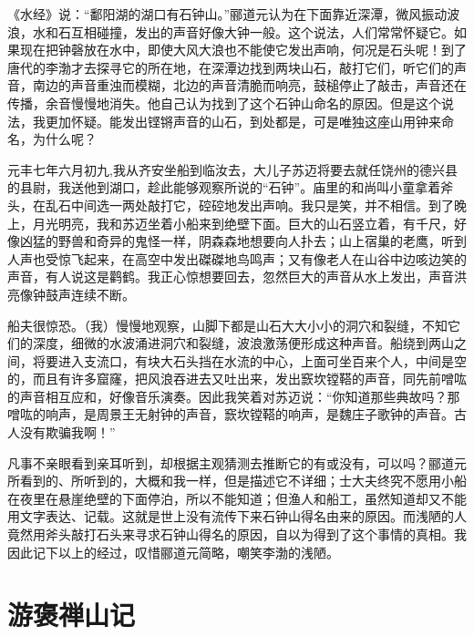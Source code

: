 \documentclass[12pt,UTF-8,openany,a4]{ctexbook}
\begin{document}
\vspace{1em}

\begin{large}\yiwen
    
    《水经》说：“鄱阳湖的湖口有石钟山。”郦道元认为在下面靠近深潭，微风振动波浪，水和石互相碰撞，发出的声音好像大钟一般。这个说法，人们常常怀疑它。如果现在把钟磬放在水中，即使大风大浪也不能使它发出声响，何况是石头呢！到了唐代的李渤才去探寻它的所在地，在深潭边找到两块山石，敲打它们，听它们的声音，南边的声音重浊而模糊，北边的声音清脆而响亮，鼓槌停止了敲击，声音还在传播，余音慢慢地消失。他自己认为找到了这个石钟山命名的原因。但是这个说法，我更加怀疑。能发出铿锵声音的山石，到处都是，可是唯独这座山用钟来命名，为什么呢？
    
    元丰七年六月初九,我从齐安坐船到临汝去，大儿子苏迈将要去就任饶州的德兴县的县尉，我送他到湖口，趁此能够观察所说的“石钟”。庙里的和尚叫小童拿着斧头，在乱石中间选一两处敲打它，硿硿地发出声响。我只是笑，并不相信。到了晚上，月光明亮，我和苏迈坐着小船来到绝壁下面。巨大的山石竖立着，有千尺，好像凶猛的野兽和奇异的鬼怪一样，阴森森地想要向人扑去；山上宿巢的老鹰，听到人声也受惊飞起来，在高空中发出磔磔地鸟鸣声；又有像老人在山谷中边咳边笑的声音，有人说这是鹳鹤。我正心惊想要回去，忽然巨大的声音从水上发出，声音洪亮像钟鼓声连续不断。
    
    船夫很惊恐。（我）慢慢地观察，山脚下都是山石大大小小的洞穴和裂缝，不知它们的深度，细微的水波涌进洞穴和裂缝，波浪激荡便形成这种声音。船绕到两山之间，将要进入支流口，有块大石头挡在水流的中心，上面可坐百来个人，中间是空的，而且有许多窟窿，把风浪吞进去又吐出来，发出窾坎镗鞳的声音，同先前噌吰的声音相互应和，好像音乐演奏。因此我笑着对苏迈说：“你知道那些典故吗？那噌吰的响声，是周景王无射钟的声音，窾坎镗鞳的响声，是魏庄子歌钟的声音。古人没有欺骗我啊！”
    
    凡事不亲眼看到亲耳听到，却根据主观猜测去推断它的有或没有，可以吗？郦道元所看到的、所听到的，大概和我一样，但是描述它不详细；士大夫终究不愿用小船在夜里在悬崖绝壁的下面停泊，所以不能知道；但渔人和船工，虽然知道却又不能用文字表达、记载。这就是世上没有流传下来石钟山得名由来的原因。而浅陋的人竟然用斧头敲打石头来寻求石钟山得名的原因，自以为得到了这个事情的真相。我因此记下以上的经过，叹惜郦道元简略，嘲笑李渤的浅陋。
    

\end{large}



\chapter{游褒禅山记}
\end{document}
